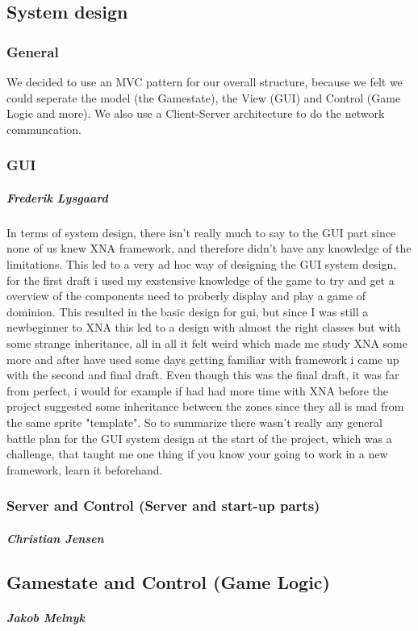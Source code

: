 \subsection{System design}
\subsubsection{General}
We decided to use an MVC pattern for our overall structure, because we felt we could seperate the model (the Gamestate), the View (GUI) and Control (Game Logic and more). We also use a Client-Server architecture to do the network communcation.

\subsubsection{GUI}
\subparagraph{Frederik Lysgaard}
In terms of system design, there isn't really much to say to the GUI part since none of us knew XNA framework, and therefore didn't have any knowledge of the limitations. This led to a very ad hoc way of designing the GUI system design, for the first draft i used my exstensive knowledge of the game to try and get a overview of the components need to proberly display and play a game of dominion. 
This resulted in the basic design for gui, but since I was still a newbeginner to XNA this led to a design with almost the right classes but with some strange inheritance, all in all it felt weird which made me study XNA some more and after have used some days getting familiar with framework i came up with the second and final draft. Even though this was the final draft, it was far from perfect, i would for example if had had more time with XNA before the project suggested some inheritance between the zones since they all is mad from the same sprite "template". So to summarize there wasn't really any general battle plan for the GUI system design at the start of the project, which was a challenge, that taught me one thing if you know your going to work in a new framework, learn it beforehand.
  
\subsubsection{Server and Control (Server and start-up parts)}
\subparagraph{Christian Jensen}

\subsection{Gamestate and Control (Game Logic)}
\subparagraph{Jakob Melnyk}
